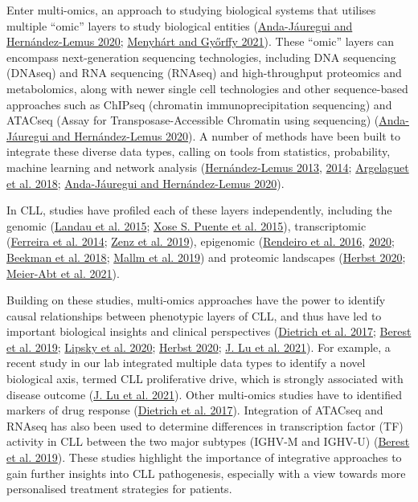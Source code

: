 \documentclass[11pt, a4paper, twosided]{book}
\begin{document}
Enter multi-omics, an approach to studying biological systems that utilises multiple ``omic'' layers to study biological entities (\protect\hyperlink{ref-Anda2020}{Anda-Jáuregui and Hernández-Lemus 2020}; \protect\hyperlink{ref-Menyhart2021}{Menyhárt and Győrffy 2021}). These ``omic'' layers can encompass next-generation sequencing technologies, including DNA sequencing (DNAseq) and RNA sequencing (RNAseq) and high-throughput proteomics and metabolomics, along with newer single cell technologies and other sequence-based approaches such as ChIPseq (chromatin immunoprecipitation sequencing) and ATACseq (Assay for Transposase-Accessible Chromatin using sequencing) (\protect\hyperlink{ref-Anda2020}{Anda-Jáuregui and Hernández-Lemus 2020}). A number of methods have been built to integrate these diverse data types, calling on tools from statistics, probability, machine learning and network analysis (\protect\hyperlink{ref-Hernandez2013}{Hernández-Lemus 2013}, \protect\hyperlink{ref-Hernandez2014}{2014}; \protect\hyperlink{ref-Argelaguet2018}{Argelaguet et al. 2018}; \protect\hyperlink{ref-Anda2020}{Anda-Jáuregui and Hernández-Lemus 2020}).

In CLL, studies have profiled each of these layers independently, including the genomic (\protect\hyperlink{ref-Landau2015}{Landau et al. 2015}; \protect\hyperlink{ref-Puente2015}{Xose S. Puente et al. 2015}), transcriptomic (\protect\hyperlink{ref-Ferreira2014}{Ferreira et al. 2014}; \protect\hyperlink{ref-Zenz2019}{Zenz et al. 2019}), epigenomic (\protect\hyperlink{ref-Rendeiro2016}{Rendeiro et al. 2016}, \protect\hyperlink{ref-Rendeiro2020}{2020}; \protect\hyperlink{ref-Beekman2018}{Beekman et al. 2018}; \protect\hyperlink{ref-Mallm2019}{Mallm et al. 2019}) and proteomic landscapes (\protect\hyperlink{ref-HerbstThesis}{Herbst 2020}; \protect\hyperlink{ref-MeierAbt2021}{Meier-Abt et al. 2021}).

Building on these studies, multi-omics approaches have the power to identify causal relationships between phenotypic layers of CLL, and thus have led to important biological insights and clinical perspectives (\protect\hyperlink{ref-JCIpaper}{Dietrich et al. 2017}; \protect\hyperlink{ref-Berest2019}{Berest et al. 2019}; \protect\hyperlink{ref-Lipsky2020}{Lipsky et al. 2020}; \protect\hyperlink{ref-HerbstThesis}{Herbst 2020}; \protect\hyperlink{ref-Lu2021}{J. Lu et al. 2021}). For example, a recent study in our lab integrated multiple data types to identify a novel biological axis, termed CLL proliferative drive, which is strongly associated with disease outcome (\protect\hyperlink{ref-Lu2021}{J. Lu et al. 2021}). Other multi-omics studies have to identified markers of drug response (\protect\hyperlink{ref-JCIpaper}{Dietrich et al. 2017}). Integration of ATACseq and RNAseq has also been used to determine differences in transcription factor (TF) activity in CLL between the two major subtypes (IGHV-M and IGHV-U) (\protect\hyperlink{ref-Berest2019}{Berest et al. 2019}). These studies highlight the importance of integrative approaches to gain further insights into CLL pathogenesis, especially with a view towards more personalised treatment strategies for patients.
\end{document}
